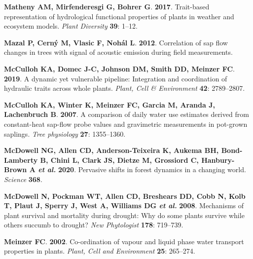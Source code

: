 \documentclass[11pt,twoside]{reedthesis}
\begin{document}
\hypertarget{ref-Matheny2017}{}
\textbf{\textnormal{Matheny AM}, \textnormal{Mirfenderesgi G},
\textnormal{Bohrer G}}. \textbf{2017}. Trait-based representation of
hydrological functional properties of plants in weather and ecosystem
models. \emph{Plant Diversity} \textbf{39}: 1--12.

\hypertarget{ref-Mazal2012}{}
\textbf{\textnormal{Mazal P}, \textnormal{Cerný M}, \textnormal{Vlasic
F}, \textnormal{Nohál L}}. \textbf{2012}. Correlation of sap flow
changes in trees with signal of acoustic emission during field
measurements.

\hypertarget{ref-McCulloh2019}{}
\textbf{\textnormal{McCulloh KA}, \textnormal{Domec J-C},
\textnormal{Johnson DM}, \textnormal{Smith DD}, \textnormal{Meinzer
FC}}. \textbf{2019}. A dynamic yet vulnerable pipeline: Integration and
coordination of hydraulic traits across whole plants. \emph{Plant, Cell
\& Environment} \textbf{42}: 2789--2807.

\hypertarget{ref-McCulloh2007}{}
\textbf{\textnormal{McCulloh KA}, \textnormal{Winter K},
\textnormal{Meinzer FC}, \textnormal{Garcia M}, \textnormal{Aranda J},
\textnormal{Lachenbruch B}}. \textbf{2007}. A comparison of daily water
use estimates derived from constant-heat sap-flow probe values and
gravimetric measurements in pot-grown saplings. \emph{Tree physiology}
\textbf{27}: 1355--1360.

\hypertarget{ref-McDowell2020}{}
\textbf{\textnormal{McDowell NG}, \textnormal{Allen CD},
\textnormal{Anderson-Teixeira K}, \textnormal{Aukema BH},
\textnormal{Bond-Lamberty B}, \textnormal{Chini L}, \textnormal{Clark
JS}, \textnormal{Dietze M}, \textnormal{Grossiord C},
\textnormal{Hanbury-Brown A} \emph{et al.}} \textbf{2020}. Pervasive
shifts in forest dynamics in a changing world. \emph{Science}
\textbf{368}.

\hypertarget{ref-McDowell2008}{}
\textbf{\textnormal{McDowell N}, \textnormal{Pockman WT},
\textnormal{Allen CD}, \textnormal{Breshears DD}, \textnormal{Cobb N},
\textnormal{Kolb T}, \textnormal{Plaut J}, \textnormal{Sperry J},
\textnormal{West A}, \textnormal{Williams DG} \emph{et al.}}
\textbf{2008}. Mechanisms of plant survival and mortality during
drought: Why do some plants survive while others succumb to drought?
\emph{New Phytologist} \textbf{178}: 719--739.

\hypertarget{ref-meinzer_co-ordination_2002}{}
\textbf{\textnormal{Meinzer FC}}. \textbf{2002}. Co-ordination of vapour
and liquid phase water transport properties in plants. \emph{Plant, Cell
and Environment} \textbf{25}: 265--274.
\end{document}
